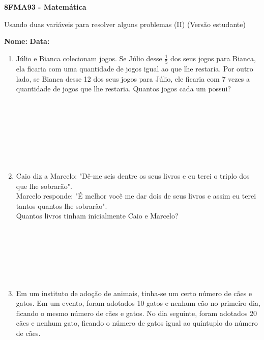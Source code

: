 \documentclass[a4paper,14pt]{article}
\begin{document}
	
	\noindent\textbf{8FMA93 - Matemática} 
	
	\begin{center}Usando duas variáveis para resolver alguns problemas (II) (Versão estudante)
	\end{center}
	
	\noindent\textbf{Nome:} \underline{\hspace{10cm}}
	\noindent\textbf{Data:} \underline{\hspace{4cm}}
	
    \begin{multicols}{2}
    	\begin{enumerate}
			\item Júlio e Bianca colecionam jogos. Se Júlio desse $\frac{1}{5}$ dos seus jogos para Bianca, ela ficaria com uma quantidade de jogos igual ao que lhe restaria. Por outro lado, se Bianca desse 12 dos seus jogos para Júlio, ele ficaria com 7 vezes a quantidade de jogos que lhe restaria. Quantos jogos cada um possui? \\\\\\\\\\\\\\\\
			\item Caio diz a Marcelo: "Dê-me seis dentre os seus livros e eu terei o triplo dos que lhe sobrarão". \\
			Marcelo responde: "É melhor você me dar dois de seus livros e assim eu terei tantos quantos lhe sobrarão". \\
			Quantos livros tinham inicialmente Caio e Marcelo? \\\\\\\\\\\\\\
			\item Em um instituto de adoção de animais, tinha-se um certo número de cães e gatos. Em um evento, foram adotados 10 gatos e nenhum cão no primeiro dia, ficando o mesmo número de cães e gatos. No dia seguinte, foram adotados 20 cães e nenhum gato, ficando o número de gatos igual ao quíntuplo do número de cães. \\

\end{enumerate}
\end{multicols}
\end{document}
